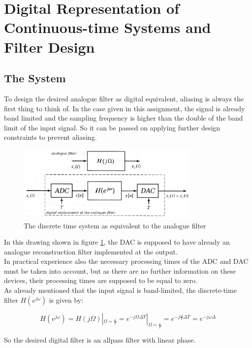 \section{Digital Representation of Continuous-time Systems and Filter Design} 

\subsection{The System}

To design the desired analogue filter as digital equivalent, aliasing is always the first thing to think of. In the case given in this assignment, the signal is already band limited and the sampling frequency is higher than the double of the band limit of the input signal. So it can be passed on applying further design constraints to prevent aliasing.

\begin{figure}[h]
\centering
\includegraphics[width=0.8\textwidth]{pics/drawing.png}
\caption{The discrete time system as equivalent to the analogue filter}
\label{fig:draw}
\end{figure}

In this drawing shown in figure \ref{fig:draw}, the DAC is supposed to have already an analogue reconstruction filter implemented at the output.\\
In practical experience also the necessary processing times of the ADC and DAC must be taken into account, but as there are no further information on these devices, their processing times are supposed to be equal to zero.\\
As already mentioned that the input signal is band-limited, the discrete-time filter $H(e^{j\omega})$ is given by:

\begin{equation}
H(e^{j \omega}) = H(j \Omega) |_{\Omega = \frac{\omega}{T}} = e^{-j\Omega \Delta T} |_{\Omega = \frac{\omega}{T}} = e^{-j \frac{\omega}{T} \Delta T} = e^{-j \omega \Delta}
\end{equation}

So the desired digital filter is an allpass filter with linear phase.


